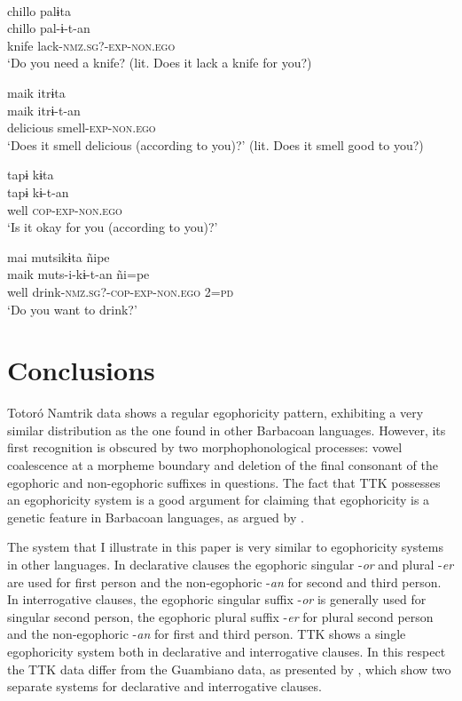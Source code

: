 \documentclass[output=paper]{langsci/langscibook}
\begin{document}

\ea
{}\\ 
	\ea \label{ex:gg69a}
	\glll chillo	palɨta\\
	chillo	pal-ɨ-t-an\\
	knife	lack-\textsc{nmz.sg?-exp-non.ego}\\
	\glt ‘Do you need a knife? (lit. Does it lack a knife for you?)
	
	\ex \label{ex:gg69b}
	\glll maik itrɨta\\
	maik itrɨ-t-an\\
	delicious smell-\textsc{exp-non.ego}\\
	\glt ‘Does it smell delicious (according to you)?’ (lit. Does it smell good to you?)
	
	\ex \label{ex:gg69c}
	\glll tapɨ kɨta\\
	tapɨ kɨ-t-an\\
	well \textsc{cop-exp-non.ego}\\
	\glt ‘Is it okay for you (according to you)?’
	
	\ex \label{ex:gg69d}
	\glll mai mutsikɨta	ñipe\\
	maik muts-i-kɨ-t-an ñi=pe\\
	well drink-\textsc{nmz.sg?-cop-exp-non.ego} 2=\textsc{pd}\\
	\glt ‘Do you want to drink?’
\z \z


\section{Conclusions}\label{s:gg6}

Totoró Namtrik data shows a regular egophoricity pattern, exhibiting a very similar distribution as the one found in other Barbacoan languages. However, its first recognition is obscured by two morphophonological processes: vowel coalescence at a morpheme boundary and deletion of the final consonant of the egophoric and non-egophoric suffixes in questions. The fact that TTK possesses an egophoricity system is a good argument for claiming that egophoricity is a genetic feature in Barbacoan languages, as argued by \citet{CurnowLiddicoat1998}. 

The system that I illustrate in this paper is very similar to egophoricity systems in other languages. In declarative clauses the egophoric singular -\textit{or} and plural -\textit{er} are used for first person and the non-egophoric -\textit{an} for second and third person. In interrogative clauses, the egophoric singular suffix -\textit{or} is generally used for singular second person, the egophoric plural suffix -\textit{er} for plural second person and the non-egophoric -\textit{an} for first and third person. TTK shows a single egophoricity system both in declarative and interrogative clauses. In this respect the TTK data differ from the Guambiano data, as presented by \citet{Norcliffe2018}, which show two separate systems for declarative and interrogative clauses. 
\end{document}
